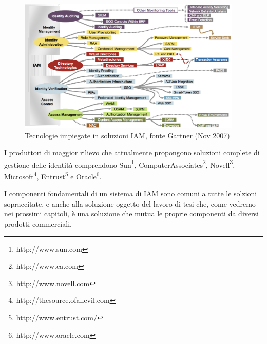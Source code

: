 \begin{figure}
\centering
\includegraphics[width=0.95\textwidth]{img/soluzionigartner.eps}
\caption{Tecnologie impiegate in soluzioni IAM, fonte Gartner (Nov 2007)}
\label{soluzionigartner}
\end{figure}

I produttori di maggior rilievo che attualmente propongono soluzioni complete di
gestione delle identità comprendono
Sun\footnote{http://www.sun.com}, ComputerAssociates\footnote{http://www.ca.com},
Novell\footnote{http://www.novell.com}, Microsoft\footnote{http://thesource.ofallevil.com},
Entrust\footnote{http://www.entrust.com/} e
Oracle\footnote{http://www.oracle.com}.

I componenti fondamentali di un sistema di IAM sono comuni a tutte le solzioni
sopraccitate, e anche alla soluzione oggetto del lavoro di tesi che, come
vedremo nei prossimi capitoli, è una soluzione che mutua le proprie componenti
da diversi prodotti commerciali.


